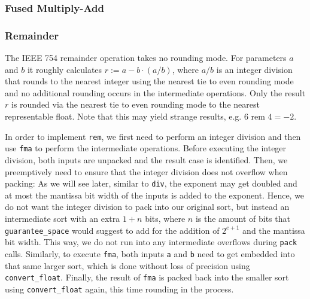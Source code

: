 \documentclass[a4paper,UKenglish,cleveref, autoref, thm-restate]{lipics-v2019}
\begin{document}
\subsubsection{Fused Multiply-Add}

\subsubsection{Remainder}
\label{rem}
The IEEE 754 remainder operation takes no rounding mode. For parameters $a$ and $b$ it roughly calculates $r := a - b \cdot (a / b)$, where $a / b$ is an integer division that rounds to the nearest integer using the nearest tie to even rounding mode and no additional rounding occurs in the intermediate operations. Only the result $r$ is rounded via the nearest tie to even rounding mode to the nearest representable float. Note that this may yield strange results, e.g. $6 \text{ rem } 4 = -2$.

In order to implement \verb|rem|, we first need to perform an integer division and then use \verb|fma| to perform the intermediate operations. Before executing the integer division, both inputs are unpacked and the result case is identified. Then, we preemptively need to ensure that the integer division does not overflow when packing: As we will see later, similar to \verb|div|, the exponent may get doubled and at most the mantissa bit width of the inputs is added to the exponent. Hence, we do not want the integer division to pack into our original sort, but instead an intermediate sort with an extra $1 + n$ bits, where $n$ is the amount of bits that \verb|guarantee_space| would suggest to add for the addition of $2^{e+1}$ and the mantissa bit width. This way, we do not run into any intermediate overflows during \verb|pack| calls. Similarly, to execute \verb|fma|, both inputs \verb|a| and \verb|b| need to get embedded into that same larger sort, which is done without loss of precision using \verb|convert_float|. Finally, the result of \verb|fma| is packed back into the smaller sort using \verb|convert_float| again, this time rounding in the process.
\end{document}
